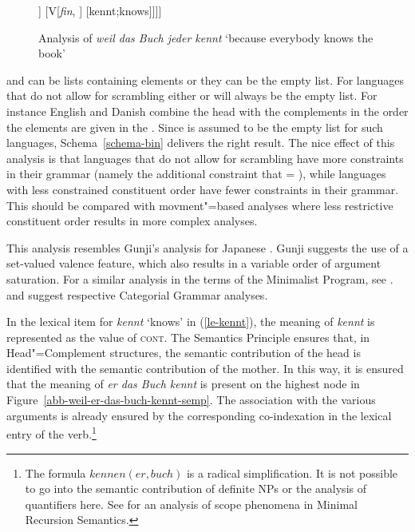 {\begin{figure}
\begin{forest}
		[\ibox{1} NP{[\textit{nom}]}
			[jeder;everyone]]
		[V{[\textit{fin}, \comps {}]}
			[kennt;knows]]]]
\end{forest}
\caption{Analysis of \emph{weil das Buch jeder kennt} `because everybody knows the book'}\label{abb-weil-das-buch-jeder-kennt}
\end{figure}
 and  can be lists containing elements or they can be the empty list. For languages
that do not allow for scrambling either  or  will always be the empty list. For
instance English and Danish combine the head with the complements in the order the elements are
given in the \compsl. Since  is assumed to be the empty list for such languages, Schema~\ref{schema-bin} delivers the right result. The nice effect of this analysis is that
languages that do not allow for scrambling have more constraints in their grammar (namely the additional
constraint that  = \eliste), while languages with less constrained constituent order have
fewer constraints in their grammar. This should be compared with movment"=based analyses where less
restrictive constituent order results in more complex analyses.

This analysis resembles Gunji's analysis for Japanese \citeyearpar{Gunji86a}. Gunji suggests the use of a set-valued
valence feature, which also results in a variable order of argument saturation. For a similar analysis in the terms
of the Minimalist Program, see .  \citet[Section~3.1]{Hoffmann95a-u} and
\citet{SB2006a-u} suggest respective Categorial Grammar analyses.

In the lexical item for \emph{kennt} `knows' in (\ref{le-kennt}), the meaning of \emph{kennt} is represented as the
value of \textsc{cont}. The Semantics Principle \citep[]{ps2} ensures that, in Head"=Complement structures, the semantic contribution
of the head is identified with the semantic contribution of the mother. In this way, it is ensured that the meaning of \emph{er das Buch kennt}
is present on the highest node in Figure~\vref{abb-weil-er-das-buch-kennt-semp}. The association with the various arguments is already ensured by
the corresponding co-indexation in the lexical entry of the verb.\footnote{
		The formula $kennen(er, buch)$ is a radical simplification. It is not possible to go into
		the semantic contribution of definite NPs or the analysis of quantifiers here. See
                 for an analysis of scope phenomena in Minimal Recursion Semantics.%
}


}
